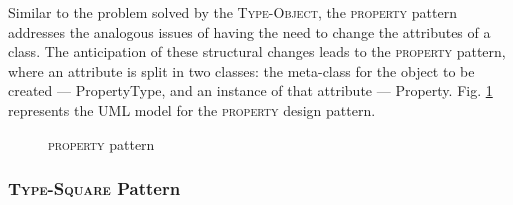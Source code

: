 Similar to the problem solved by the \textsc{Type-Object}, the \textsc{property} pattern addresses the analogous issues of having the need to change the attributes of a class. The anticipation of these structural changes leads to the \textsc{property} pattern, where an attribute is split in two classes: the meta-class for the object to be created --- PropertyType, and an instance of that attribute --- Property. Fig. \ref{fig:property_pattern} represents the UML model for the \textsc{property} design pattern.

\begin{figure}[H]
  \centering
  \caption{\textsc{property} pattern}
  \label{fig:property_pattern}
\end{figure}

\subsubsection{\textsc{Type-Square} Pattern}\label{sec:type-square_pattern}

